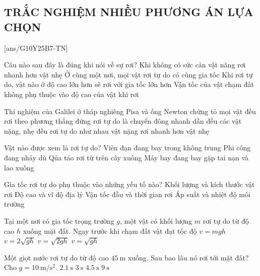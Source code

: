 \subsection{TRẮC NGHIỆM NHIỀU PHƯƠNG ÁN LỰA CHỌN}
\setcounter{ex}{0}
[ans/G10Y25B7-TN]
\begin{ex}
	Câu nào sau đây là đúng khi nói về sự rơi?
	\choice
	{Khi không có sức cản vật năng rơi nhanh hơn vật nhẹ}
	{\True Ở cùng một nơi, mọi vật rơi tự do có cùng gia tốc}
	{Khi rơi tự do, vật nào ở độ cao lớn hơn sẽ rơi với gia tốc lớn hơn}
	{Vận tốc của vật chạm đất không phụ thuộc vào độ cao của vật khi rơi}
\end{ex}

\begin{ex}
	Thí nghiệm của Galilei ở tháp nghiêng Pisa và ống Newton chứng tỏ
	\choice
	{mọi vật đều rơi theo phương thẳng đứng}
	{rơi tự do là chuyển đông nhanh dần đều}
	{\True các vật nặng, nhẹ đều rơi tự do như nhau}
	{vật nặng rơi nhanh hơn vật nhẹ}
	\loigiai{
	}
\end{ex}

\begin{ex}
	Vật nào được xem là rơi tự do?
	\choice
	{Viên đạn đang bay trong không trung}
	{Phi công đang nhảy dù}
	{\True Qủa táo rơi từ trên cây xuống}
	{Máy bay đang bay gặp tai nạn và lao xuống}
	\loigiai{
	}
\end{ex}

\begin{ex}
	Gia tốc rơi tự do phụ thuộc vào những yếu tố nào?
	\choice
	{Khối lượng và kích thước vật rơi}
	{\True Độ cao và vĩ độ địa lý}
	{Vận tốc đầu và thời gian rơi}
	{Áp suất và nhiệt độ môi trường}
	\loigiai{
	}
\end{ex}

\begin{ex}
	Tại một nơi có gia tốc trọng trường $g$, một vật có khối lượng $m$ rơi tự do từ độ cao $h$ xuống mặt đất. Ngay trước khi chạm đất vật đạt tốc độ
	\choice
	{$v=mgh$}
	{$v=2\sqrt{gh}$}
	{\True $v=\sqrt{2gh}$}
	{$v=\sqrt{gh}$}
	\loigiai{
	}
\end{ex}

\begin{ex}
	Một giọt nước rơi tự do từ độ cao $\SI{45}{\meter}$ xuống. Sau bao lâu nó rơi tới mặt đất? Cho $g=\SI{10}{\meter/\second^2}$.
	\choice
	{$\SI{2.1}{\second}$}
	{\True $\SI{3}{\second}$}
	{$\SI{4.5}{\second}$}
	{$\SI{9}{\second}$}
\end{ex}

